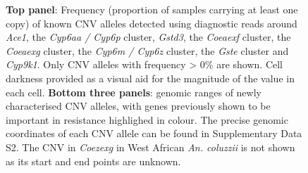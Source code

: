 \documentclass[a4paper,12pt]{article}
\begin{document}
\begin{figure}[h]
	\begin{center}
		\vskip 1cm
		\vskip 1cm
		\vskip 1cm
	\end{center}
	\caption{\footnotesize \textbf{Top panel}: Frequency (proportion of samples carrying at least one copy) of known CNV alleles detected using diagnostic reads around \textit{Ace1}, the \textit{Cyp6aa / Cyp6p} cluster, \textit{Gstd3}, the \textit{Coeaexf} cluster, the \textit{Coeaexg} cluster, the \textit{Cyp6m / Cyp6z} cluster, the \textit{Gste} cluster and \textit{Cyp9k1}. Only CNV alleles with frequency > 0\% are shown. Cell darkness provided as a visual aid for the magnitude of the value in each cell. \textbf{Bottom three panels}: genomic ranges of newly characterised CNV alleles, with genes previously shown to be important in resistance highlighed in colour. The precise genomic coordinates of each CNV allele can be found in Supplementary Data S2. The CNV in \textit{Coezexg} in West African \textit{An. coluzzii} is not shown as its start and end points are unknown.}
	\label{FigS5}
\end{figure}
\end{document}
